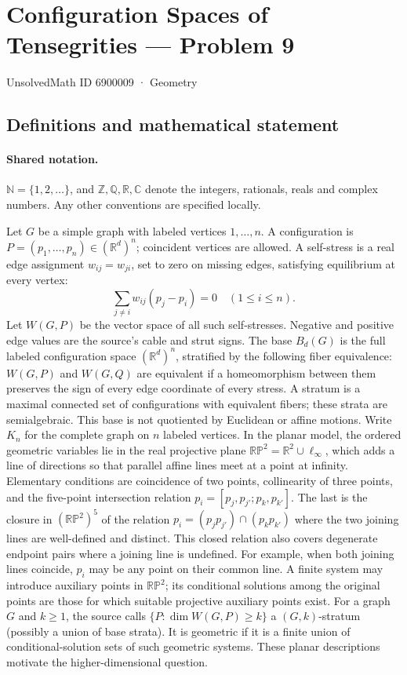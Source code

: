 \documentclass[11pt]{article}
\begin{document}
\setcounter{section}{6900008}
\section{Configuration Spaces of Tensegrities — Problem 9}\label{6900009}
{\small\sffamily UnsolvedMath ID 6900009 · Geometry}
\subsection{Definitions and mathematical statement}

\paragraph{Shared notation.}$\mathbb N=\{1,2,\ldots\}$, and $\mathbb Z,\mathbb Q,\mathbb R,\mathbb C$ denote the integers, rationals, reals and complex numbers. Any other conventions are specified locally.


Let $G$ be a simple graph with labeled vertices $1,\ldots,n$. A configuration is $P=(p_1,\ldots,p_n)\in(\mathbb R^d)^n$; coincident vertices are allowed. A self-stress is a real edge assignment $w_{ij}=w_{ji}$, set to zero on missing edges, satisfying equilibrium at every vertex:
\[\sum_{j\ne i}w_{ij}(p_j-p_i)=0\quad(1\leq i\leq n).\]
Let $W(G,P)$ be the vector space of all such self-stresses. Negative and positive edge values are the source’s cable and strut signs. The base $B_d(G)$ is the full labeled configuration space $(\mathbb R^d)^n$, stratified by the following fiber equivalence: $W(G,P)$ and $W(G,Q)$ are equivalent if a homeomorphism between them preserves the sign of every edge coordinate of every stress. A stratum is a maximal connected set of configurations with equivalent fibers; these strata are semialgebraic. This base is not quotiented by Euclidean or affine motions. Write $K_n$ for the complete graph on $n$ labeled vertices. In the planar model, the ordered geometric variables lie in the real projective plane $\mathbb{RP}^2=\mathbb R^2\cup\ell_\infty$, which adds a line of directions so that parallel affine lines meet at a point at infinity. Elementary conditions are coincidence of two points, collinearity of three points, and the five-point intersection relation $p_i=[p_j,p_{j\prime};p_k,p_{k\prime}]$. The last is the closure in $(\mathbb{RP}^2)^5$ of the relation $p_i=(p_jp_{j\prime})\cap(p_kp_{k\prime})$ where the two joining lines are well-defined and distinct. This closed relation also covers degenerate endpoint pairs where a joining line is undefined. For example, when both joining lines coincide, $p_i$ may be any point on their common line. A finite system may introduce auxiliary points in $\mathbb{RP}^2$; its conditional solutions among the original points are those for which suitable projective auxiliary points exist. For a graph $G$ and $k\geq1$, the source calls $\{P:\dim W(G,P)\geq k\}$ a $(G,k)$-stratum (possibly a union of base strata). It is geometric if it is a finite union of conditional-solution sets of such geometric systems. These planar descriptions motivate the higher-dimensional question.
\end{document}
